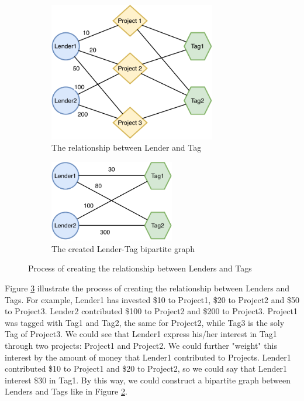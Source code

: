 \begin{figure}[H]
	\centering
	\begin{subfigure}[b]{0.4\textwidth}
		\centering
		\includegraphics[width=0.8\textwidth]{images/schema_lender_tag.pdf}
		\caption{The relationship between Lender and Tag}
		\label{fig:schema_lender_tag}
	\end{subfigure}
	\hspace{5mm}
	\begin{subfigure}[b]{0.4\textwidth}
		\centering
		\includegraphics[width=0.6\textwidth]{images/create_lender_tag.pdf}
		\caption{The created Lender-Tag bipartite graph}
		\label{fig:create_lender_tag2}
	\end{subfigure}
	\caption{Process of creating the relationship between Lenders and Tags}
	\label{fig:create_lender_tag}
\end{figure}


Figure \ref{fig:create_lender_tag} illustrate the process of creating the relationship between Lenders and Tags.
For example, Lender1 has invested \$10 to Project1, \$20 to Project2 and \$50 to Project3.
Lender2 contributed \$100 to Project2 and \$200 to Project3.
Project1 was tagged with Tag1 and Tag2, the same for Project2, while Tag3 is the soly Tag of Project3.
We could see that Lender1 express his/her interest in Tag1 through two projects: Project1 and Project2.
We could further "weight" this interest by the amount of money that Lender1 contributed to Projects.
Lender1 contributed \$10 to Project1 and \$20 to Project2,
so we could say that Lender1 interest \$30 in Tag1.
By this way, we could construct a bipartite graph between Lenders and Tags like in Figure \ref{fig:create_lender_tag2}.

